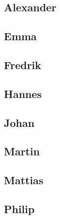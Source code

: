 \documentclass[a4paper]{article}
\begin{document}
  \subsection{Alexander}
  \subsection{Emma}
  \subsection{Fredrik}
  \subsection{Hannes}
  \subsection{Johan}
  \subsection{Martin}
  \subsection{Mattias}
  \subsection{Philip}
\end{document}
